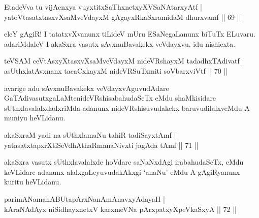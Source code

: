 \begin{shl}
EtadeVva tu vijAcnxya vuyxtitxSaThxnetxyXVSaNAtarxyAtf |\\
yatoV\s tasatxtasxvXsaMveVdayxM gAgayxRkaSxramidaM dhurxvamf \hfill || 69 ||
\end{shl}

\begin{artha}
eleY gAgiR! I tatatxvXvanunx tiLideV mUru ESaNegaLanunx biTuTx ELuvaru. adariMdaleV I akaSxra vasutx sAvxnuBavakekx veVdayxvu. idu nishicxta.
\end{artha}


\begin{shl}
teVSAM ceVtAsxyXtasxvXsaMveVdayxM nideVRshayxM tadadhxTAdivatf |\\
asUthxlatAvxnanx tacaCxkayxM nideVRSuTxmiti soV\s barxviVtf \hfill || 70 ||
\end{shl}

\begin{artha}
avarige adu sAvxnuBavakekx veVdayxvAguvudAdare GaTAdivasutxgaLaMte\break nideVRshisabahudaSeTx eMdu shaMkisidare sUthxlavalalxdadxriMda adanunx nideVRshisuvudakekx baruvudilalxveMdu A muniyu heVLidanu.
\end{artha}


\begin{shl}
akaSxraM yadi na sUthxlamaNu tahiR tadiSayxtAmf |\\
yatasatxtapxrXtiSeVdhAthaRmanaNivxti jagAda tAmf \hfill || 71 ||
\end{shl}

\begin{artha}
akaSxra vasutx sUthxlavalalxde hoVdare saNaNxdAgi irabahudaSeTx, eMdu keVLidare adanunx alalxgaLeyuvudakAkxgi `anaNu' eMdu A gAgiRyanunx kuritu heVLidanu.
\end{artha}


\begin{shl}
parimANamahABUtapArxNanAmAnavxyAdayaH |\\
kAraNAdAyx niSidhayxnetxV karxmeVNa pArxpatxyXpeVkaSxyA \hfill || 72 ||
\end{shl}


